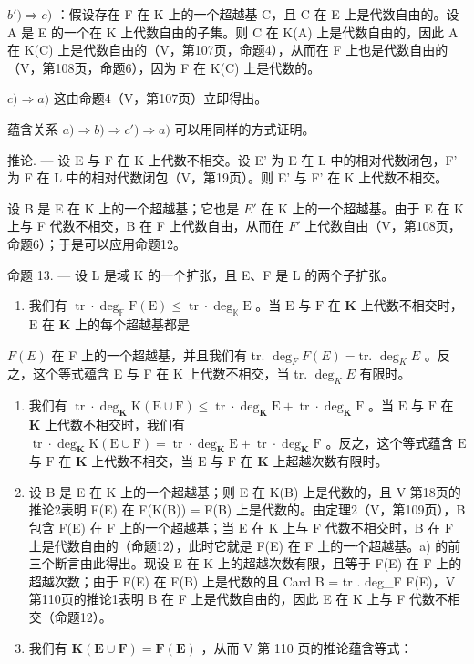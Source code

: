 \(b') \Rightarrow c)\) ：假设存在 F 在 K 上的一个超越基 C，且 C 在 E 上是代数自由的。设 A 是 E 的一个在 K 上代数自由的子集。则 C 在 K(A) 上是代数自由的，因此 A 在 K(C) 上是代数自由的（V，第107页，命题4），从而在 F 上也是代数自由的（V，第108页，命题6），因为 F 在 K(C) 上是代数的。

\(c) \Rightarrow a)\) 这由命题4（V，第107页）立即得出。

蕴含关系 \(a) \Rightarrow b) \Rightarrow c') \Rightarrow a)\) 可以用同样的方式证明。

推论. --- 设 E 与 F 在 K 上代数不相交。设 E' 为 E 在 L 中的相对代数闭包，F' 为 F 在 L 中的相对代数闭包（V，第19页）。则 E' 与 F' 在 K 上代数不相交。

设 B 是 E 在 K 上的一个超越基；它也是 \(E'\) 在 K 上的一个超越基。由于 E 在 K 上与 F 代数不相交，B 在 F 上代数自由，从而在 \(F'\) 上代数自由（V，第108页，命题6）；于是可以应用命题12。

命题 13. --- 设 L 是域 K 的一个扩张，且 E、F 是 L 的两个子扩张。

\begin{enumerate}
\def\labelenumi{\alph{enumi})}
\tightlist
\item
  我们有 \(\operatorname{tr} \cdot \deg_{\mathbb{F}} \mathrm{F}(\mathrm{E}) \leqslant \operatorname{tr} \cdot \deg_{\mathbb{K}} \mathrm{E}\) 。当 \(\mathrm{E}\) 与 \(\mathrm{F}\) 在 \(\mathbf{K}\) 上代数不相交时， \(\mathrm{E}\) 在 \(\mathbf{K}\) 上的每个超越基都是
\end{enumerate}

\(F(E)\) 在 F 上的一个超越基，并且我们有 tr. \(\deg_{F}F(E) = \text{tr. } \deg_{K}E\) 。反之，这个等式蕴含 E 与 F 在 K 上代数不相交，当 tr. \(\deg_{K}E\) 有限时。

\begin{enumerate}
\def\labelenumi{\alph{enumi})}
\setcounter{enumi}{1}
\item
  我们有 \(\operatorname{tr} \cdot \deg_{\mathbf{K}} \mathrm{K}(\mathrm{E} \cup \mathrm{F}) \leqslant \operatorname{tr} \cdot \deg_{\mathbf{K}} \mathrm{E} + \operatorname{tr} \cdot \deg_{\mathbf{K}} \mathrm{F}\) 。当 \(\mathrm{E}\) 与 \(\mathrm{F}\) 在 \(\mathbf{K}\) 上代数不相交时，我们有 \(\operatorname{tr} \cdot \deg_{\mathbf{K}} \mathrm{K}(\mathrm{E} \cup \mathrm{F}) = \operatorname{tr} \cdot \deg_{\mathbf{K}} \mathrm{E} + \operatorname{tr} \cdot \deg_{\mathbf{K}} \mathrm{F}\) 。反之，这个等式蕴含 \(\mathrm{E}\) 与 \(\mathrm{F}\) 在 \(\mathbf{K}\) 上代数不相交，当 \(\mathrm{E}\) 与 \(\mathrm{F}\) 在 \(\mathbf{K}\) 上超越次数有限时。
\item
  设 B 是 E 在 K 上的一个超越基；则 E 在 K(B) 上是代数的，且 V 第18页的推论2表明 F(E) 在 F(K(B)) = F(B) 上是代数的。由定理2（V，第109页），B 包含 F(E) 在 F 上的一个超越基；当 E 在 K 上与 F 代数不相交时，B 在 F 上是代数自由的（命题12），此时它就是 F(E) 在 F 上的一个超越基。a) 的前三个断言由此得出。现设 E 在 K 上的超越次数有限，且等于 F(E) 在 F 上的超越次数；由于 F(E) 在 F(B) 上是代数的且 Card B = tr . deg\_F F(E)，V 第110页的推论1表明 B 在 F 上是代数自由的，因此 E 在 K 上与 F 代数不相交（命题12）。
\item
  我们有 \(\mathbf{K}(\mathbf{E} \cup \mathbf{F}) = \mathbf{F}(\mathbf{E})\) ，从而 V 第 110 页的推论蕴含等式：
\end{enumerate}

